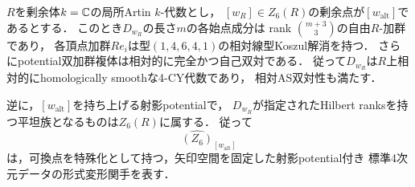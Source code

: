 \begin{theorem}[rank条件による可換点の形式模型]
\label{thm:p3-formal-rank-six}
$R$を剰余体$k=\mathbb C$の局所Artin $k$-代数とし，
$[w_R]\in Z_6(R)$の剰余点が$[w_{\mathrm{alt}}]$であるとする．
このとき$D_{w_R}$の長さ$m$の各始点成分は
rank $\binom{m+3}{3}$の自由$R$-加群であり，
各頂点加群$R e_i$は型$(1,4,6,4,1)$の相対線型Koszul解消を持つ．
さらにpotential双加群複体は相対的に完全かつ自己双対である．
従って$D_{w_R}$は$R$上相対的にhomologically smoothな4-CY代数であり，
相対AS双対性も満たす．

逆に，$[w_{\mathrm{alt}}]$を持ち上げる射影potentialで，
$D_{w_R}$が指定されたHilbert ranksを持つ平坦族となるものは$Z_6(R)$に属する．
従って
\[
 \widehat{(Z_6)}_{[w_{\mathrm{alt}}]}
\]
は，可換点を特殊化として持つ，矢印空間を固定した射影potential付き
標準4次元データの形式変形関手を表す．
\end{theorem}
